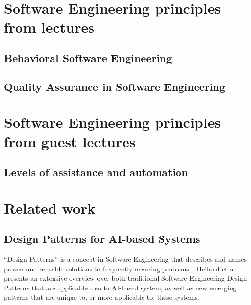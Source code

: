 \documentclass[a4paper,twocolumn]{article}
\begin{document}
\section*{Software Engineering principles from lectures}

\subsection*{Behavioral Software Engineering}

\subsection*{Quality Assurance in Software Engineering}

\section*{Software Engineering principles from guest lectures}

\subsection*{Levels of assistance and automation}

\section*{Related work}

\subsection*{Design Patterns for AI-based Systems}

``Design Patterns'' is a concept in Software Engineering that describes and names proven and reusable solutions to frequently occuring problems~\cite{Gamma2001}. 
Heiland et al.~\cite{heiland_design_2023} presents an extensive overview over both traditional Software Engineering Design Patterns that are applicable also to AI-based system, as well as new emerging patterns that are
unique to, or more applicable to, these systems.




\end{document}
